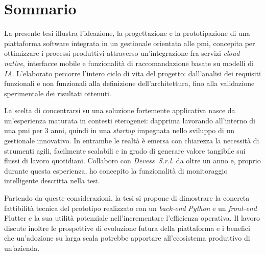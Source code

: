 \cleardoublepage
{}
{}
\begingroup
\let\clearpage\relax
\let\cleardoublepage\relax
\chapter*{Sommario}

La presente tesi illustra l’ideazione, la progettazione e la prototipazione di una piattaforma software 
integrata in un gestionale orientata alle \gls{pmi}, concepita per ottimizzare i processi produttivi 
attraverso un’integrazione fra servizi \textit{cloud\nobreakdash-native}, interfacce mobile e funzionalità 
di raccomandazione basate su modelli di \textit{IA}.  
L’elaborato percorre l’intero ciclo di vita del progetto: dall’analisi dei requisiti funzionali e non 
funzionali alla definizione dell’architettura, fino alla validazione sperimentale dei risultati ottenuti.

La scelta di concentrarsi su una soluzione fortemente applicativa nasce da un’esperienza maturata in 
contesti eterogenei: dapprima lavorando all’interno di una \gls{pmi} per 3 anni, quindi in una \textit{startup} impegnata 
nello sviluppo di un gestionale innovativo. In entrambe le realtà è emersa con chiarezza la necessità 
di strumenti agili, facilmente scalabili e in grado di generare valore tangibile sui flussi di lavoro 
quotidiani.  
Collaboro con \textit{Devess~S.r.l.} da oltre un anno e, proprio durante questa esperienza, 
ho concepito la funzionalità di monitoraggio intelligente descritta nella tesi.

Partendo da queste considerazioni, la tesi si propone di dimostrare la concreta fattibilità tecnica 
del prototipo realizzato con un \textit{back\nobreakdash-end} \textit{Python} e un 
\textit{front\nobreakdash-end} Flutter e la sua utilità potenziale nell’incrementare l’efficienza 
operativa. Il lavoro discute inoltre le prospettive di evoluzione futura della piattaforma e i benefici 
che un’adozione su larga scala potrebbe apportare all’ecosistema produttivo di un'azienda.

\endgroup
\vfill
